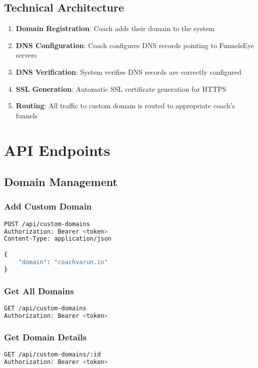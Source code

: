 \documentclass[12pt,a4paper]{article}
\begin{document}
\subsection{Technical Architecture}

\begin{enumerate}
    \item \textbf{Domain Registration}: Coach adds their domain to the system
    \item \textbf{DNS Configuration}: Coach configures DNS records pointing to FunnelsEye servers
    \item \textbf{DNS Verification}: System verifies DNS records are correctly configured
    \item \textbf{SSL Generation}: Automatic SSL certificate generation for HTTPS
    \item \textbf{Routing}: All traffic to custom domain is routed to appropriate coach's funnels
\end{enumerate}

\section{API Endpoints}

\subsection{Domain Management}

\subsubsection{Add Custom Domain}
\begin{lstlisting}[language=bash,frame=single]
POST /api/custom-domains
Authorization: Bearer <token>
Content-Type: application/json

{
    "domain": "coachvarun.in"
}
\end{lstlisting}

\subsubsection{Get All Domains}
\begin{lstlisting}[language=bash,frame=single]
GET /api/custom-domains
Authorization: Bearer <token>
\end{lstlisting}

\subsubsection{Get Domain Details}
\begin{lstlisting}[language=bash,frame=single]
GET /api/custom-domains/:id
Authorization: Bearer <token>
\end{lstlisting}
\end{document}
